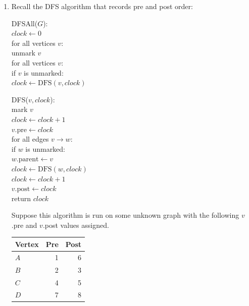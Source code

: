 \documentclass[11pt]{article}
\begin{document}
\begin{enumerate}
    \newpage
    \item Recall the DFS algorithm that records pre and post order:
   \par\vspace{1em} 
    \begin{minipage}[t]{0.43\linewidth}
    \begin{algo}
    DFSAll($G$):\+\\
        $clock \gets 0$\\
        for all vertices $v$:\+\\
            unmark $v$\-\\
        for all vertices $v$:\+\\
            if $v$ is unmarked:\+\\
                $clock \gets \mathrm{DFS}(v, clock)$\-\-
    \end{algo}
    \end{minipage}\hfill
    \begin{minipage}[t]{0.54\linewidth}
    \begin{algo}
    DFS($v, clock$):\+\\
        mark $v$\\
        $clock \gets clock + 1$\\
        $v.\mathrm{pre} \gets clock$\\
        for all edges $v \to w$:\+\\
            if $w$ is unmarked:\+\\
                $w.\mathrm{parent} \gets v$\\
                $clock \gets \mathrm{DFS}(w, clock)$\-\-\\
        $clock \gets clock + 1$\\
        $v.\mathrm{post} \gets clock$\\
        return $clock$
    \end{algo}
    \end{minipage}
\par\vspace{1em}
Suppose this algorithm is run on some unknown graph with
the following
$v$.pre and $v$.post values assigned.
    \begin{center}
    \begin{tabular}{lrr}
        Vertex & Pre & Post \\
        \hline
        $A$ & 1 & 6 \\
        $B$ & 2 & 3 \\
        $C$ & 4 & 5 \\
        $D$ & 7 & 8 \\
    \end{tabular}
    \end{center}


\end{enumerate}
\end{document}
